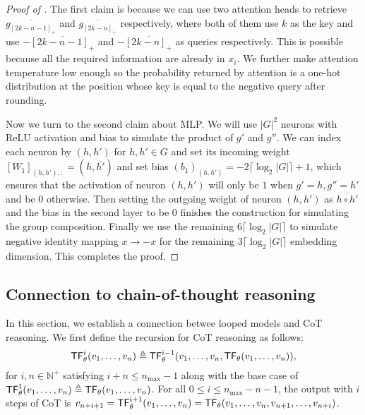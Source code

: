 \begin{proof}[Proof of ]
The first claim is because we can use two attention heads to retrieve $ \overline{g_{[2k-n-1]_+}}$ and $ \overline{g_{[2k-n]_+}}$ respectively, where both of them use $\overline{k}$ as the key and use $-\overline{[2k-n-1]_+}$ and $-\overline{[2k-n]_+}$ as queries respectively. This is possible because all the required information are already in $x_i$. We further make attention temperature low enough so the probability returned by attention is a one-hot distribution at the position whose key is equal to the negative query after rounding.

Now we turn to the second claim about MLP. We will use $|G|^2$ neurons with ReLU activation and bias to simulate the product of $g'$ and $g''$. We can index each neuron 
by $(h,h')$ for $h,h'\in G$ and set its incoming weight $[W_1]_{(h,h'),:} = (\overline{h},\overline{h'})$ and set bias $(b_1)_{(h,h')} = - 2\lceil\log_2 |G|\rceil+1$, which ensures that the activation of neuron $(h,h')$ will only be $1$ when $g'=h,g''=h'$ and be $0$ otherwise. Then setting the outgoing weight of neuron $(h,h')$ as $\overline{h\circ h'}$ and the bias in the second layer to be $0$ finishes the construction for simulating the group composition. Finally we use the remaining $6\lceil\log_2 |G|\rceil$ to simulate negative identity mapping $x\to-x$ for the remaining $3\lceil\log_2 |G|\rceil$ embedding dimension. This completes the proof.
\end{proof}








\subsection{Connection to chain-of-thought reasoning}
\label{sec:apx_cot_connection}


In this section, we establish a connection betwee looped models and CoT reasoning. We first define the recursion for CoT reasoning as follows:
$$
\mathsf{TF}^{i}_\theta(v_1,\ldots,v_n)\triangleq \mathsf{TF}^{i-1}_\theta(v_1,\ldots,v_n, \mathsf{TF}_\theta(v_1,\ldots,v_n)),$$ for $i, n \in \mathbb{N}^+$ satisfying $i+n\le n_{\max}-1$ along with the base case of $\mathsf{TF}^{1}_\theta(v_1,\ldots,v_n)\triangleq\mathsf{TF}_\theta(v_1,\ldots,v_n)$. For all $0\le i\le n_{\max} - n-1$, the output with $i$ steps of CoT is
$v_{n+i+1}  = \mathsf{TF}^{i+1}_\theta(v_1,\ldots,v_n) = \mathsf{TF}_\theta(v_1,\ldots,v_n,v_{n+1},\ldots,v_{n+i})$.

